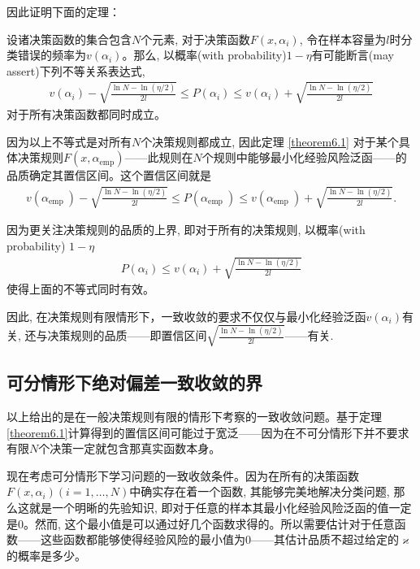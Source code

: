 因此证明下面的定理：
\begin{theorem}\label{theorem6.1}
\citep{vapnik1998}
设诸决策函数的集合包含$N$个元素, 对于决策函数$F(x,\alpha_i)$, 令在样本容量为$l$时分类错误的频率为$v(\alpha_i)$。那么, 以概率(with probability)$1-\eta$有可能断言(may assert)下列不等关系表达式,
\begin{align}
v\left(\alpha_{i}\right)-\sqrt{\frac{\ln N-\ln (\eta / 2)}{2 l}} \leq P\left(\alpha_{i}\right) \leq v\left(\alpha_{i}\right)+\sqrt{\frac{\ln N-\ln (\eta / 2)}{2 l}}
\end{align}
对于所有决策函数都同时成立。
\end{theorem}

\begin{remark}
因为以上不等式是对所有$N$个决策规则都成立, 因此定理 \ref{theorem6.1} 对于某个具体决策规则$F(x,\alpha_{\text{emp}})$——此规则在$N$个规则中能够最小化经验风险泛函——的品质确定其置信区间。这个置信区间就是
\begin{align}
v\left(\alpha_{\text {emp }}\right)-\sqrt{\frac{\ln N-\ln (\eta / 2)}{2 l}} \leq P\left(\alpha_{\text {emp }}\right) \leq v\left(\alpha_{\text {emp }}\right)+\sqrt{\frac{\ln N-\ln (\eta / 2)}{2 l}}.
\end{align}
\end{remark}

因为更关注决策规则的品质的上界, 即对于所有的决策规则, 以概率(with probability) $1-\eta$
\begin{align}
P\left(\alpha_{i}\right) \leq v\left(\alpha_{i}\right)+\sqrt{\frac{\ln N-\ln (\eta / 2)}{2 l}}
\end{align}
使得上面的不等式同时有效。

因此, 在决策规则有限情形下，一致收敛的要求不仅仅与最小化经验泛函$v(\alpha_{i})$有关, 还与决策规则的品质——即置信区间$\sqrt{\frac{\ln N-\ln (\eta / 2)}{2 l}}$——有关.

\subsection{可分情形下绝对偏差一致收敛的界}
\label{sec:kefen}
以上给出的是在一般决策规则有限的情形下考察的一致收敛问题。基于定理\ref{theorem6.1}计算得到的置信区间可能过于宽泛——因为在不可分情形下并不要求有限$N$个决策一定就包含那真实函数本身。

现在考虑可分情形下学习问题的一致收敛条件。因为在所有的决策函数$F(x,\alpha_i)(i=1,\ldots,N)$中确实存在着一个函数, 其能够完美地解决分类问题, 那么这就是一个明晰的先验知识, 即对于任意的样本其最小化经验风险泛函的值一定是0。然而, 这个最小值是可以通过好几个函数求得的。所以需要估计对于任意函数——这些函数都能够使得经验风险的最小值为0——其估计品质不超过给定的$\varkappa$的概率是多少。

